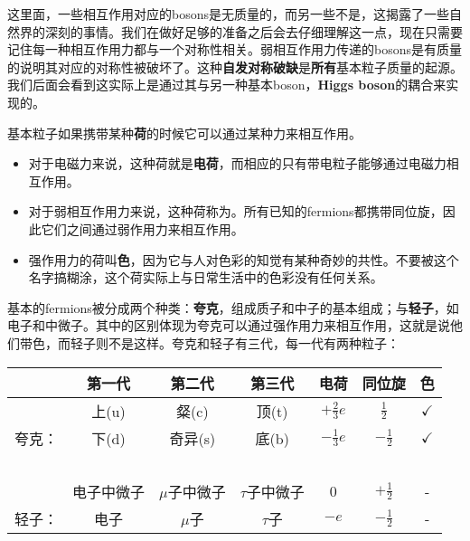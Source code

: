 这里面，一些相互作用对应的bosons是无质量的，而另一些不是，这揭露了一些自然界的深刻的事情。我们在做好足够的准备之后会去仔细理解这一点，现在只需要记住每一种相互作用力都与一个对称性相关。弱相互作用力传递的bosons是有质量的说明其对应的对称性被破坏了。这种{\bfseries 自发对称破缺}是{\bfseries 所有}基本粒子质量的起源。我们后面会看到这实际上是通过其与另一种基本boson，{\bfseries Higgs boson}的耦合来实现的。

基本粒子如果携带某种{\bfseries 荷}的时候它可以通过某种力来相互作用。

\begin{itemize}
\item 对于电磁力来说，这种荷就是{\bfseries 电荷}，而相应的只有带电粒子能够通过电磁力相互作用。
\item 对于弱相互作用力来说，这种荷称为。所有已知的fermions都携带同位旋，因此它们之间通过弱作用力来相互作用。
\item 强作用力的荷叫{\bfseries 色}，因为它与人对色彩的知觉有某种奇妙的共性。不要被这个名字搞糊涂，这个荷实际上与日常生活中的色彩没有任何关系。
\end{itemize}

基本的fermions被分成两个种类：{\bfseries 夸克}，组成质子和中子的基本组成；与{\bfseries 轻子}，如电子和中微子。其中的区别体现为夸克可以通过强作用力来相互作用，这就是说他们带色，而轻子则不是这样。夸克和轻子有三代，每一代有两种粒子：

\begin{table}[h]
\centering
\begin{tabular}{c|c|c|c|c|c|c}
 \hline
 & 第一代 & 第二代 & 第三代 & 电荷 & 同位旋 & 色 \\
 \hline
 & 上(u)  & 粲(c) &  顶(t) & $+\tfrac{2}{3}e$  & $\tfrac{1}{2}$ & $\checkmark$\\
 夸克： & 下(d) & 奇异(s) &底(b) & $-\tfrac{1}{3}e$ & $-\tfrac{1}{2}$ & $\checkmark$\\
 \hline
 \ &\ &\ &\ &\ &\ &\ \\
 \hline
 & 电子中微子 & $\mu$子中微子 & $\tau$子中微子 & 0 & $+\tfrac{1}{2}$ & -\\
 轻子：&电子 & $\mu$子 & $\tau$子 & $-e$ & $-\tfrac{1}{2}$ & -\\
 \hline
\end{tabular}
\end{table}

